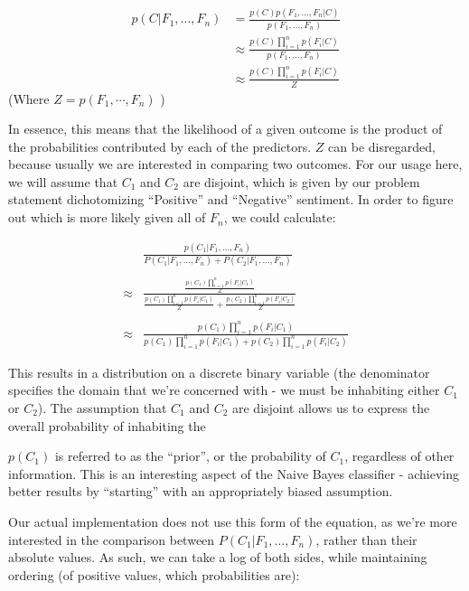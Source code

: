 \documentclass[12pt,a4paper]{article}
\begin{document}
\begin{align*}
p(C \vert F_1,\dots,F_n) & = \frac{p(C) p(F_1,\dots,F_n\vert C)}{p(F_1,\dots,F_n)}    \\
                         & \approx \frac{p(C) \prod_{i=1}^n p(F_i \vert C)}{p(F_1,\dots,F_n)} \\
                         & \approx \frac{p(C) \prod_{i=1}^n p(F_i \vert C)}{Z}
\end{align*}
(Where $ Z = p(F_1,\cdots,F_n) $ )

In essence, this means that the likelihood of a given outcome is the product of the probabilities contributed by each of the predictors.  $ Z $ can be disregarded, because usually we are interested in comparing two outcomes.  For our usage here, we will assume that $ C_1 $ and $ C_2 $ are disjoint, which is given by our problem statement dichotomizing ``Positive'' and ``Negative'' sentiment.  In order to figure out which is more likely given all of $F_n$, we could calculate:

\begin{align*}
  & \frac{\displaystyle p(C_1 \vert F_1,\dots,F_n) } { P(C_1 \vert F_1,\dots,F_n) + P(C_2 \vert F_1,\dots,F_n) } \\
  & \\
  \approx & \frac{\displaystyle \frac{\displaystyle p(C_1) \prod_{i=1}^n p(F_i \vert C_1)}{\displaystyle Z}}{\frac{\displaystyle p(C_1) \prod_{i=1}^n p(F_i \vert C_1)}{\displaystyle Z} + \frac{\displaystyle p(C_2) \prod_{i=1}^n p(F_i \vert C_2)}{\displaystyle Z}} \\
  & \\
  \approx & \frac{\displaystyle p(C_1) \prod_{i=1}^n p(F_i \vert C_1)}{p(C_1) \prod_{i=1}^n p(F_i \vert C_1) + p(C_2) \prod_{i=1}^n p(F_i \vert C_2)}
\end{align*}

This results in a distribution on a discrete binary variable (the denominator specifies the domain that we're concerned with - we must be inhabiting either $ C_1 $ or $ C_2 $).  The assumption that $ C_1 $ and $ C_2 $ are disjoint allows us to express the overall probability of inhabiting the 

$ p(C_1) $ is referred to as the ``prior'', or the probability of $ C_1 $, regardless of other information.  This is an interesting aspect of the Naive Bayes classifier - achieving better results by ``starting'' with an appropriately biased assumption.

Our actual implementation does not use this form of the equation, as we're more interested in the comparison between $ P(C_1 \vert F_1,\dots,F_n) $, rather than their absolute values.  As such, we can take a log of both sides, while maintaining ordering (of positive values, which probabilities are):
\end{document}
